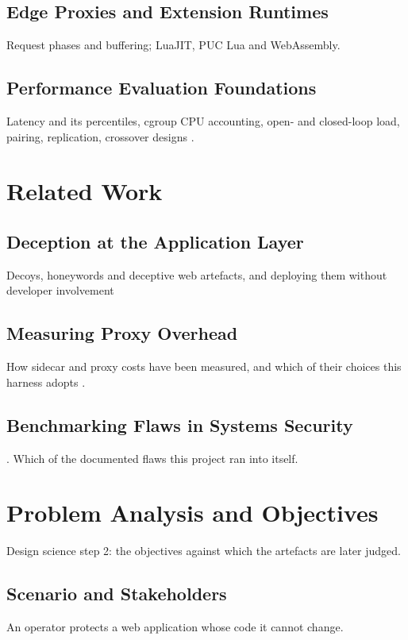 \documentclass{rptuma}
\begin{document}
\section{Edge Proxies and Extension Runtimes}
Request phases and buffering; LuaJIT, PUC Lua and WebAssembly.
\section{Performance Evaluation Foundations}
Latency and its percentiles, cgroup CPU accounting, open- and closed-loop load, pairing,
replication, crossover designs \cite{jain1991art,williams1949designs}.

\chapter{Related Work}
\section{Deception at the Application Layer}
Decoys, honeywords and deceptive web artefacts, and deploying them without developer involvement
\cite{bowen2009baiting,juels2013honeywords,virvilis2014changing,kahlhofer2024application}
\section{Measuring Proxy Overhead}
How sidecar and proxy costs have been measured, and which of their choices this harness adopts
\cite{zhu2022dissecting}.
\section{Benchmarking Flaws in Systems Security}
\cite{vanderkouwe2019sok,heiser_crimes}. Which of the documented flaws this project ran into
itself.

\chapter{Problem Analysis and Objectives}
Design science step 2: the objectives against which the artefacts are later judged.

\section{Scenario and Stakeholders}
An operator protects a web application whose code it cannot change.
\end{document}
